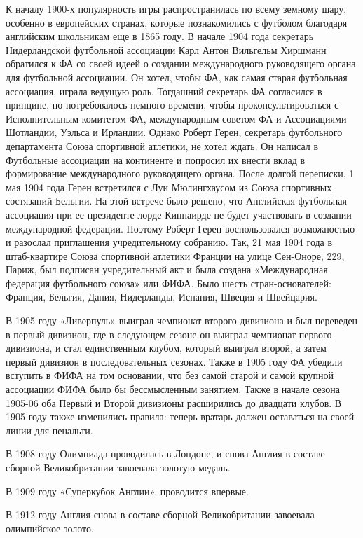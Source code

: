 К началу 1900-х популярность игры распространилась по всему земному шару, особенно в европейских странах, которые познакомились с футболом благодаря английским школьникам еще в 1865 году. В начале 1904 года секретарь Нидерландской футбольной ассоциации Карл Антон Вильгельм Хиршманн обратился к ФА со своей идеей о создании международного руководящего органа для футбольной ассоциации. Он хотел, чтобы ФА, как самая старая футбольная ассоциация, играла ведущую роль. Тогдашний секретарь ФА согласился в принципе, но потребовалось немного времени, чтобы проконсультироваться с Исполнительным комитетом ФА, международным советом ФА и Ассоциациями Шотландии, Уэльса и Ирландии. Однако Роберт Герен, секретарь футбольного департамента Союза спортивной атлетики, не хотел ждать. Он написал в Футбольные ассоциации на континенте и попросил их внести вклад в формирование международного руководящего органа. После долгой переписки, 1 мая 1904 года Герен встретился с Луи Мюлингхаусом из Союза спортивных состязаний Бельгии. На этой встрече было решено, что Английская футбольная ассоциация при ее президенте лорде Киннаирде не будет участвовать в создании международной федерации. Поэтому Роберт Герен воспользовался возможностью и разослал приглашения учредительному собранию. Так, 21 мая 1904 года в штаб-квартире Союза спортивной атлетики Франции на улице Сен-Оноре, 229, Париж, был подписан учредительный акт и была создана «Международная федерация футбольного союза» или ФИФА. Было шесть стран-основателей: Франция, Бельгия, Дания, Нидерланды, Испания, Швеция и Швейцария.

В 1905 году «Ливерпуль» выиграл чемпионат второго дивизиона и был переведен в первый дивизион, где в следующем сезоне он выиграл чемпионат первого дивизиона, и стал единственным клубом, который выиграл второй, а затем первый дивизион в последовательных сезонах. Также в 1905 году ФА убедили вступить в ФИФА на том основании, что без самой старой и самой крупной ассоциации ФИФА было бы бессмысленным занятием. Также в начале сезона 1905-06 оба Первый и Второй дивизионы расширились до двадцати клубов.  В 1905 году также изменились правила: теперь вратарь должен оставаться на своей линии для пенальти.

В 1908 году Олимпиада проводилась в Лондоне, и снова Англия в составе сборной Великобритании завоевала золотую медаль.

В 1909 году «Суперкубок Англии», проводится впервые.

В 1912 году Англия снова в составе сборной Великобритании завоевала олимпийское золото.

